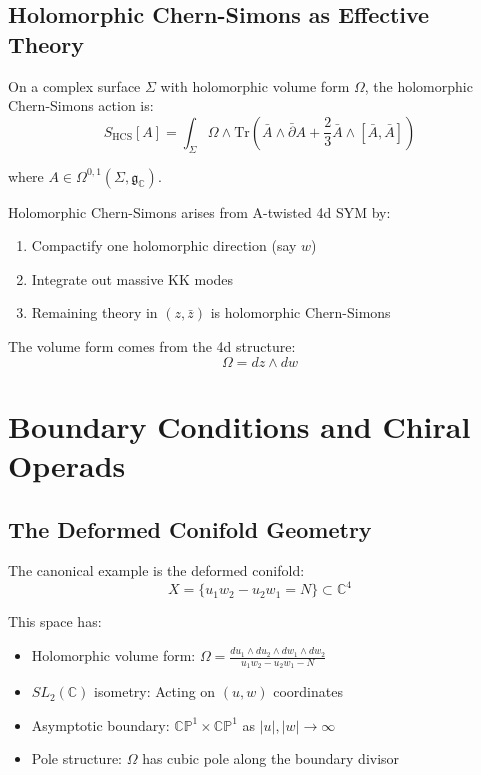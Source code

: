 \subsection{Holomorphic Chern-Simons as Effective Theory}

\begin{definition}
On a complex surface $\Sigma$ with holomorphic volume form $\Omega$, the 
holomorphic Chern-Simons action is:
$$S_{\text{HCS}}[A] = \int_{\Sigma} \Omega \wedge \text{Tr}\left(\bar{A} 
\wedge \bar{\partial} A + \frac{2}{3} \bar{A} \wedge [\bar{A}, \bar{A}]\right)$$

where $A \in \Omega^{0,1}(\Sigma, \mathfrak{g}_{\mathbb{C}})$.
\end{definition}

\begin{theorem}
Holomorphic Chern-Simons arises from A-twisted 4d SYM by:
\begin{enumerate}
\item Compactify one holomorphic direction (say $w$)
\item Integrate out massive KK modes
\item Remaining theory in $(z, \bar{z})$ is holomorphic Chern-Simons
\end{enumerate}

The volume form comes from the 4d structure:
$$\Omega = dz \wedge dw$$
\end{theorem}

\section{Boundary Conditions and Chiral Operads}

\subsection{The Deformed Conifold Geometry}

\begin{example}
The canonical example is the deformed conifold:
$$X = \{u_1 w_2 - u_2 w_1 = N\} \subset \mathbb{C}^4$$

This space has:
\begin{itemize}
\item Holomorphic volume form: $\Omega = \frac{du_1 \wedge du_2 \wedge dw_1 
\wedge dw_2}{u_1 w_2 - u_2 w_1 - N}$
\item $SL_2(\mathbb{C})$ isometry: Acting on $(u, w)$ coordinates
\item Asymptotic boundary: $\mathbb{CP}^1 \times \mathbb{CP}^1$ as $|u|, |w| 
\to \infty$
\item Pole structure: $\Omega$ has cubic pole along the boundary divisor
\end{itemize}
\end{example}

